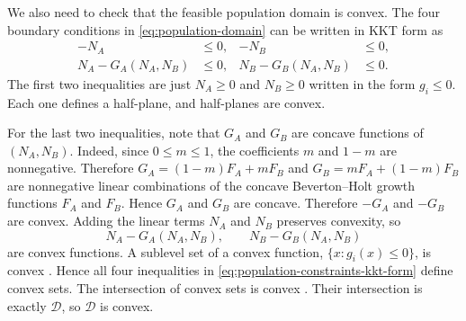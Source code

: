 \documentclass{article}
\numberwithin{equation}{section}
\begin{document}
We also need to check that the feasible population domain is convex. The
four boundary conditions in \eqref{eq:population-domain} can be
written in KKT form as
\begin{equation}
    \label{eq:population-constraints-kkt-form}
    \begin{aligned}
        -N_A&\leq0,
        &
        -N_B&\leq0,
        \\
        N_A-G_A(N_A,N_B)&\leq0,
        &
        N_B-G_B(N_A,N_B)&\leq0.
    \end{aligned}
\end{equation}
The first two inequalities are just $N_A\geq0$ and $N_B\geq0$ written in
the form $g_i\leq0$. Each one defines a half-plane, and half-planes are
convex.

For the last two inequalities, note that $G_A$ and $G_B$ are concave
functions of $(N_A,N_B)$. Indeed, since $0\leq m\leq1$, the coefficients
$m$ and $1-m$ are nonnegative. Therefore $G_A=(1-m)F_A+mF_B$ and
$G_B=mF_A+(1-m)F_B$ are nonnegative linear combinations of the concave
Beverton--Holt growth functions $F_A$ and $F_B$. Hence $G_A$ and $G_B$
are concave. Therefore $-G_A$ and $-G_B$ are convex. Adding the linear
terms $N_A$ and $N_B$ preserves convexity, so
\begin{equation*}
    N_A-G_A(N_A,N_B),
    \qquad
    N_B-G_B(N_A,N_B)
\end{equation*}
are convex functions. A sublevel set of a convex function,
$\{x:g_i(x)\leq0\}$, is convex
\cite[Section~3.1.6]{boyd-vandenberghe-2004}. Hence all four inequalities in
\eqref{eq:population-constraints-kkt-form} define convex sets.
The intersection of convex sets is convex
\cite[Section~2.3.1]{boyd-vandenberghe-2004}. Their intersection is exactly
$\mathcal D$, so $\mathcal D$ is convex.
\end{document}
